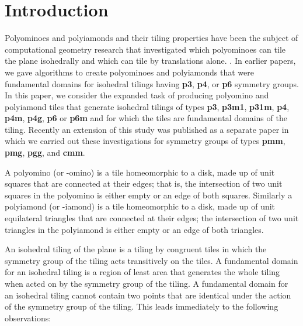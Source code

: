 \documentclass{ws-ijcga}
\begin{document}
\section{Introduction}	\label{intro}
Polyominoes and polyiamonds and their tiling properties have been the subject of 
computational geometry research that investigated 
which polyominoes can tile the plane isohedrally and 
which can tile by translations alone. \cite{rhoads,Kev}. 
In earlier papers\cite{fukuda2006,fukuda2008}, we gave algorithms to create polyominoes and
polyiamonds that were fundamental domains for isohedral tilings having {\bf p3}, {\bf p4}, or {\bf p6} symmetry
groups. 
In this paper, we consider the expanded task of producing polyomino and polyiamond
tiles that generate isohedral tilings of types {\bf p3}, {\bf p3m1}, {\bf p31m}, {\bf p4}, {\bf p4m}, {\bf p4g}, {\bf p6} 
or {\bf p6m} and for
which the tiles are fundamental domains of the tiling.
Recently an extension of this study was published as a separate paper\cite{fukuda2011} 
in which we carried out these investigations for symmetry groups of
types {\bf pmm}, {\bf pmg}, {\bf pgg}, and {\bf cmm}.


A polyomino (or -omino) is a tile homeomorphic to a disk, made up of  unit squares that
are connected at their edges; that is, the intersection of two unit squares in the polyomino is
either empty or an edge of both squares. 
Similarly a polyiamond (or -iamond) is a tile
homeomorphic to a disk, made up of  unit equilateral triangles that are connected at their edges;
the intersection of two unit triangles in the polyiamond is either empty or an edge of both
triangles.

An isohedral tiling of the plane is a tiling by congruent tiles in which the symmetry group of
the tiling acts transitively on the tiles. A fundamental domain for an isohedral tiling is a region
of least area that generates the whole tiling when acted on by the symmetry group of the tiling.
A fundamental domain for an isohedral tiling cannot contain two points that are identical under
the action of the symmetry group of the tiling. 
This leads immediately to the following observations:
\end{document}
